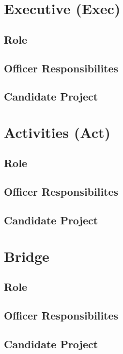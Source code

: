 \documentclass[11pt, article, oneside]{memoir}
\begin{document}
    \section{Executive (Exec)}
    \subsection{Role}

    \subsection{Officer Responsibilites}

    \subsection{Candidate Project}

    \bigbreak



    \section{Activities (Act)}
    \subsection{Role}

    \subsection{Officer Responsibilites}

    \subsection{Candidate Project}

    \section{Bridge}
    \subsection{Role}

    \subsection{Officer Responsibilites}

    \subsection{Candidate Project}
\end{document}
